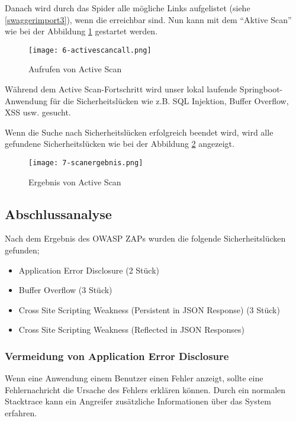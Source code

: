 Danach wird durch das Spider alle mögliche Links aufgelistet (siehe \ref{swaggerimport3}), wenn die erreichbar sind. Nun kann mit dem "`Aktive Scan"' wie bei der Abbildung \ref{swaggerimport4} gestartet werden. 

\begin{figure}[h]
	\centering
	\texttt{[image: 6-activescancall.png]}
	\caption{Aufrufen von Active Scan}
	\label{swaggerimport4}
\end{figure}

Während dem Active Scan-Fortschritt wird unser lokal laufende Springboot-Anwendung für die Sicherheitslücken wie z.B. SQL Injektion, Buffer Overflow, XSS usw. gesucht.

\newpage

Wenn die Suche nach Sicherheitslücken erfolgreich beendet wird, wird alle gefundene Sicherheitslücken wie bei der Abbildung \ref{swaggerimport5} angezeigt.

\begin{figure}[h]
	\centering
	\texttt{[image: 7-scanergebnis.png]}
	\caption{Ergebnis von Active Scan}
	\label{swaggerimport5}
\end{figure}

\subsection{Abschlussanalyse}

Nach dem Ergebnis des OWASP ZAPs wurden die folgende Sicherheitslücken gefunden;

\begin{itemize}
	\item Application Error Disclosure (2 Stück)
	\item Buffer Overflow (3 Stück)
	\item Cross Site Scripting Weakness (Persistent in JSON Response) (3 Stück)
	\item Cross Site Scripting Weakness (Reflected in JSON Responses)
\end{itemize}

\subsubsection{Vermeidung von Application Error Disclosure}

Wenn eine Anwendung einem Benutzer einen Fehler anzeigt, sollte eine Fehlernachricht die Ursache des Fehlers erklären können. Durch ein normalen Stacktrace kann ein Angreifer zusätzliche Informationen über das System erfahren. 

